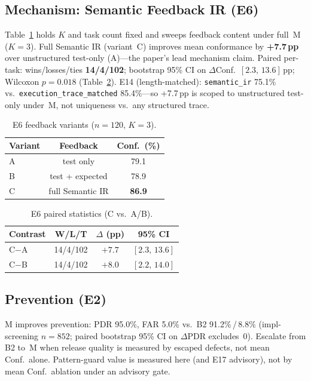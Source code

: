 \subsection{Mechanism: Semantic Feedback IR (E6)}
Table~\ref{tab:e6-conf} holds $K$ and task count fixed and sweeps feedback
content under full~M ($K{=}3$).
Full Semantic IR (variant~C) improves mean conformance by
\textbf{+7.7\,pp} over unstructured test-only (A)---the paper's lead mechanism
claim.
Paired per-task: wins/losses/ties \textbf{14/4/102}; bootstrap 95\% CI on
$\Delta$Conf.\ $[2.3,\,13.6]$\,pp; Wilcoxon $p{=}0.018$
(Table~\ref{tab:e6-paired-conf}).
E14 (length-matched): \texttt{semantic\_ir} 75.1\% vs.\
\texttt{execution\_trace\_matched} 85.4\%---so +7.7\,pp is scoped to
unstructured test-only under~M, not uniqueness vs.\ any structured trace.

\begin{table}[t]
  \centering
  \caption{E6 feedback variants ($n{=}120$, $K{=}3$).}
  \label{tab:e6-conf}
  \footnotesize
  \begin{tabular}{lcc}
    \toprule
    Variant & Feedback & Conf.\ (\%) \\
    \midrule
    A & test only        & 79.1 \\
    B & test + expected  & 78.9 \\
    C & full Semantic IR & \textbf{86.9} \\
    \bottomrule
  \end{tabular}
\end{table}

\begin{table}[t]
  \centering
  \caption{E6 paired statistics (C vs.\ A/B).}
  \label{tab:e6-paired-conf}
  \footnotesize
  \begin{tabular}{lccc}
    \toprule
    Contrast & W/L/T & $\Delta$ (pp) & 95\% CI \\
    \midrule
    C$-$A & 14/4/102 & $+7.7$ & $[2.3,\,13.6]$ \\
    C$-$B & 14/4/102 & $+8.0$ & $[2.2,\,14.0]$ \\
    \bottomrule
  \end{tabular}
\end{table}

\subsection{Prevention (E2)}
M improves prevention: PDR 95.0\%, FAR 5.0\% vs.\ B2 91.2\%\,/\,8.8\%
(impl-screening $n{=}852$; paired bootstrap 95\% CI on $\Delta$PDR excludes~0).
Escalate from B2 to~M when release quality is measured by escaped defects,
not mean Conf.\ alone.
Pattern-guard value is measured here (and E17 advisory), not by mean Conf.\
ablation under an advisory gate.

